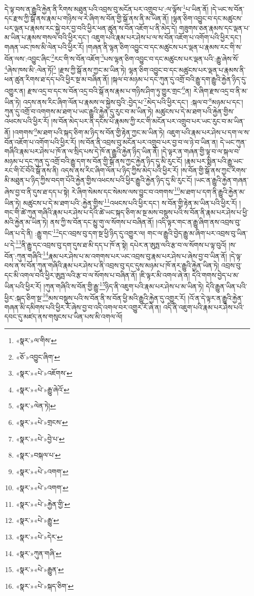 དེ་ལྟ་བས་ན་རྒྱུའི་རྐྱེན་ནི་རིགས་མཐུན་པའི་འབྲས་བུ་མངོན་པར་འགྲུབ་པ་:ལ་ལྟོས་\footnote{«སྣར་»ལ་གིས་}པ་ཡིན་ནོ། །དེ་ཡང་ས་བོན་དང་རྫས་ཀྱི་སྒོ་ནས་རྣམ་པ་གཉིས་ལ་རེ་ཞིག་ས་བོན་གྱི་སྒོ་ནས་ནི་མ་ཡིན་ནོ། །ལྷན་ཅིག་འབྱུང་བ་དང་མཚུངས་པར་ལྡན་པ་རྣམས་རང་སྐྱེ་བར་བྱ་བའི་ཕྱིར་ཕན་ཚུན་ས་བོན་འཇོག་པ་ནི་མེད་དེ། གཟུགས་ཅན་རྣམས་དང་ལྡན་པ་མ་ཡིན་པ་རྣམས་གསལ་བའི་ཕྱིར་དང་། འཇུག་པའི་རྣམ་པར་ཤེས་པ་ལ་ས་བོན་འཇོག་པ་འགོག་པའི་ཕྱིར་དང་། གཞན་ཡང་ཁས་མི་ལེན་པའི་ཕྱིར་རོ། །གཞན་ནི་ལྷན་ཅིག་འབྱུང་བ་དང་མཚུངས་པར་ལྡན་པ་རྣམས་རང་གི་ས་བོན་ལས་:འབྱུང་ཞིང་\footnote{«ཅོ་»འབྱུང་ཞིག་}རང་གི་ས་བོན་འཇོག་\footnote{«སྣར་»«པེ་»འཇོགས་}པས་ལྷན་ཅིག་འབྱུང་བ་དང་མཚུངས་པར་ལྡན་པའི་:རྒྱུ་ཞེས་སོ་\footnote{«སྣར་»«པེ་»རྒྱུ་ཞེའོ་}ཞེས་ཁས་མི་:ལེན་ཏོ།\footnote{«སྣར་»ལེན་ཏེ།} །རྫས་ཀྱི་སྒོ་ནས་ཀྱང་མ་ཡིན་ཏེ། ལྷན་ཅིག་འབྱུང་བ་དང་མཚུངས་པར་ལྡན་པ་རྣམས་ནི་ཕན་ཚུན་རིགས་ཐ་དད་པའི་ཕྱིར་སྔ་མ་བཞིན་ནོ། །སྐལ་བ་མཉམ་པ་དང་ཀུན་དུ་འགྲོ་བའི་རྒྱུ་དག་རྒྱུའི་རྐྱེན་ཉིད་དུ་འགྱུར་ན། རྫས་འདྲ་བ་དང་ས་བོན་འདྲ་བའི་སྒོ་ནས་རྣམ་པ་གཉིས་ཤིག་ཏུ་གྱུར་གྲང་\footnote{«སྣར་»«པེ་»གྲངས་}ན། རེ་ཞིག་རྫས་འདྲ་བ་ནི་མ་ཡིན་ཏེ། འདས་ནས་རིང་ཞིག་ལོན་པ་རྣམས་ལ་སྐྱེས་བུའི་:བྱེད་པ་\footnote{«སྣར་»«པེ་»བྱེ་པ་}མེད་པའི་ཕྱིར་དང་། :སྐལ་བ་\footnote{«སྣར་»བསྐལ་པ་}མཉམ་པ་དང་། ཀུན་དུ་འགྲོ་བ་འགགས་མ་ཐག་པ་ཡང་རྒྱུའི་རྐྱེན་དུ་རུང་བ་མ་ཡིན་ཏེ། མཚུངས་པ་དེ་མ་ཐག་པའི་རྐྱེན་གྱིས་འཕངས་པའི་ཕྱིར་རོ། །ས་བོན་མེད་པར་ནི་དངོས་པོ་རྣམས་ཀྱི་རང་གི་མངོན་པར་འགྲུབ་པར་ཡང་རུང་བ་མ་ཡིན་ནོ། །འགགས་\footnote{«སྣར་»«པེ་»འགག་}མ་ཐག་པའི་སྐད་ཅིག་མ་ཉིད་ས་བོན་གྱི་རྟེན་ཀྱང་མ་ཡིན་ཏེ། འཇུག་པའི་རྣམ་པར་ཤེས་པ་དག་ལ་ས་བོན་འཇོག་པ་འགོག་པའི་ཕྱིར་རོ། །ས་བོན་ནི་འབྲས་བུ་མངོན་པར་འགྲུབ་པར་བྱ་བ་ལ་ཉེ་བ་ཡིན་ན། དེ་ཡང་ཀུན་གཞིའི་རྣམ་པར་ཤེས་པ་ཁོ་ན་ལ་སྲིད་པས་དེ་ཁོ་ན་རྒྱུའི་རྐྱེན་ཉིད་ཡིན་ནོ། །དེ་ལྟར་ན་གཞན་གྱི་ལྟ་བ་ལ་སྐལ་བ་མཉམ་པ་དང་ཀུན་དུ་འགྲོ་བའི་རྒྱུ་དག་ས་བོན་གྱི་སྒོ་ནས་ཀྱང་རྐྱེན་ཉིད་དུ་མི་རུང་ངོ། །རྣམ་པར་སྨིན་པའི་རྒྱུ་ཡང་རང་གི་ངོ་བོའི་སྒོ་ནས་ནི། འདས་ནས་རིང་ཞིག་ལོན་པ་ཉིད་ཀྱིས་མེད་པའི་ཕྱིར་རོ། །ས་བོན་གྱི་སྒོ་ནས་ཀྱང་རིགས་མི་མཐུན་པ་ཉིད་ཀྱིས་བདག་པོའི་རྐྱེན་གྱིས་འཕངས་པའི་ཕྱིར་རྒྱུའི་རྐྱེན་ཉིད་དུ་མི་རུང་ངོ། །ཡང་ན་རྒྱུའི་རྐྱེན་གཞན་ཞེས་བྱ་བ་ནི་དུས་ཐ་དད་པ་སྟེ། རེ་ཞིག་སེམས་དང་སེམས་ལས་བྱུང་བ་འགགས་\footnote{«སྣར་»«པེ་»འགག་}མ་ཐག་པ་དག་ནི་རྒྱུའི་རྐྱེན་མ་ཡིན་ཏེ། མཚུངས་པ་དེ་མ་ཐག་པའི་:རྐྱེན་གྱིས་\footnote{«སྣར་»«པེ་»རྐྱེན་གྱི་}འཕངས་པའི་ཕྱིར་དང་། ས་བོན་གྱི་རྟེན་མ་ཡིན་པའི་ཕྱིར་རོ། །གང་གི་ཚེ་ཀུན་གཞིའི་རྣམ་པར་ཤེས་པ་དེའི་ཚེ་ཡང་སྐད་ཅིག་མ་སྔ་མས་བསྡུས་པའི་ས་བོན་ནི་རྣམ་པར་ཤེས་པ་ཕྱི་མའི་རྐྱེན་མ་ཡིན་ཏེ། ནས་ཀྱི་ས་བོན་དང་མྱུ་གུ་ལ་སོགས་པ་བཞིན་ནོ། །འདི་ལྟར་གང་ན་རྒྱུ་ཞིག་ནས་འབྲས་བུ་ཡིན་པ་དེ་ནི། :རྒྱུ་གང་\footnote{«སྣར་»«པེ་»རྒྱུ་}དང་འབྲས་བུ་དག་སྔ་ཕྱི་ཉིད་དུ་འགྱུར་ལ། གང་ལ་རྒྱུའི་བྱེད་རྒྱུ་མ་ཞིག་པར་འབྲས་བུ་ཡིན་པ་དེ་\footnote{«སྣར་»«པེ་»དེར་}ནི་རྒྱུ་དང་འབྲས་བུ་དག་དུས་ཐ་མི་དད་པ་ཁོ་ན་སྟེ། དཔེར་ན་ཨུཏྤ་ལའི་རྩ་བ་ལ་སོགས་པ་ལྟ་བུའོ། །ས་བོན་:ཀུན་གཞིའི་\footnote{«སྣར་»ཀུན་གཞི་}རྣམ་པར་ཤེས་པ་མ་འགགས་པར་ཡང་འབྲས་བུ་རྣམ་པར་ཤེས་པ་ཞེས་བྱ་བ་ཡིན་ནོ། །དེ་ལྟ་བས་ན་ས་བོན་ཀུན་གཞིའི་རྣམ་པར་ཤེས་པ་ནི་འབྲས་བུ་དང་དུས་མཉམ་པ་ཁོ་ནར་རྒྱུའི་རྐྱེན་ཡིན་ཏེ། འབྲས་བུ་དང་མི་འགལ་བའི་ཕྱིར་ཨུཏྤ་ལའི་རྩ་བ་ལ་སོགས་པ་བཞིན་ནོ། །ཇི་ལྟར་མི་འགལ་ཞེ་ན། དེའི་གགས་བྱེད་པ་མ་ཡིན་པའི་ཕྱིར་རོ། །ཀུན་གཞིའི་ས་བོན་གྱི་རྒྱུ་\footnote{«སྣར་»«པེ་»རྒྱུན་}ཉིད་ནི་འཇུག་པའི་རྣམ་པར་ཤེས་པ་མ་ཡིན་ཏེ། དེའི་རྒྱུན་ཡིན་པའི་ཕྱིར་:སྐད་ཅིག་སྔ་\footnote{«སྣར་»«པེ་»སྐད་ཅིག་}མས་བསྡུས་པའི་ས་བོན་ནི་ས་བོན་ཕྱི་མའི་རྒྱུའི་རྐྱེན་དུ་འགྱུར་རོ། །འོ་ན་དེ་ལྟར་ན་རྒྱུའི་རྐྱེན་གཞན་མི་དམིགས་པའི་ཕྱིར་རོ་ཞེས་བྱ་བ་འདི་འགལ་བར་འགྱུར་རོ་ཞེ་ན། འདི་ནི་འཇུག་པའི་རྣམ་པར་ཤེས་པའི་དབང་དུ་མཛད་ནས་གསུངས་པ་ཡིན་པས་མི་འགལ་ལོ། 